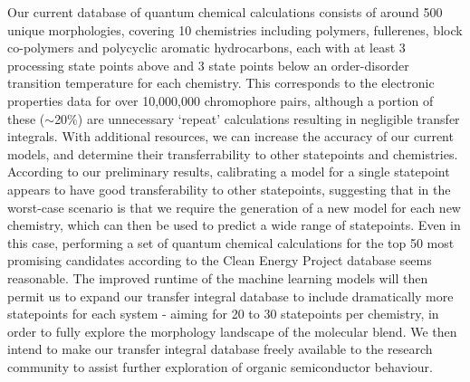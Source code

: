 \documentclass[12pt]{article}
\begin{document}


Our current database of quantum chemical calculations consists of around 500 unique morphologies, covering 10 chemistries including polymers, fullerenes, block co-polymers and polycyclic aromatic hydrocarbons, each with at least 3 processing state points above and 3 state points below an order-disorder transition temperature for each chemistry.
This corresponds to the electronic properties data for over 10,000,000 chromophore pairs, although a portion of these ($\sim$20\%) are unnecessary `repeat' calculations resulting in negligible transfer integrals.
With additional resources, we can increase the accuracy of our current models, and determine their transferrability to other statepoints and chemistries.
According to our preliminary results, calibrating a model for a single statepoint appears to have good transferability to other statepoints, suggesting that in the worst-case scenario is that we require the generation of a new model for each new chemistry, which can then be used to predict a wide range of statepoints.
Even in this case, performing a set of quantum chemical calculations for the top 50 most promising candidates according to the Clean Energy Project database seems reasonable.
The improved runtime of the machine learning models will then permit us to expand our transfer integral database to include dramatically more statepoints for each system - aiming for 20 to 30 statepoints per chemistry, in order to fully explore the morphology landscape of the molecular blend.
We then intend to make our transfer integral database freely available to the research community to assist further exploration of organic semiconductor behaviour.


\end{document}
